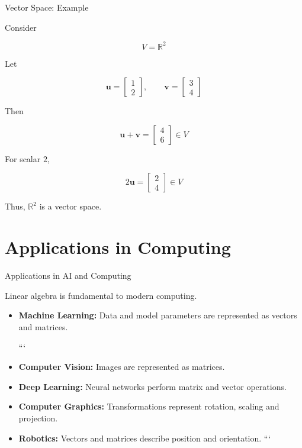 \documentclass[aspectratio=169]{beamer}
\begin{document}
\begin{frame}{Vector Space: Example}
\small

Consider

$$
V=\mathbb{R}^2
$$

Let

$$
\mathbf{u}=
\begin{bmatrix}
1\\
2
\end{bmatrix},
\qquad
\mathbf{v}=
\begin{bmatrix}
3\\
4
\end{bmatrix}
$$

Then

$$
\mathbf{u}+\mathbf{v}
=
\begin{bmatrix}
4\\
6
\end{bmatrix}
\in V
$$

For scalar $2$,

$$
2\mathbf{u}
=
\begin{bmatrix}
2\\
4
\end{bmatrix}
\in V
$$

Thus, $\mathbb{R}^2$ is a vector space.

\end{frame}

\section{Applications in Computing}

\begin{frame}{Applications in AI and Computing}
\small

Linear algebra is fundamental to modern computing.

\begin{itemize}
\item \textbf{Machine Learning:}
Data and model parameters are represented as vectors and matrices.

```
\item \textbf{Computer Vision:}
Images are represented as matrices.

\item \textbf{Deep Learning:}
Neural networks perform matrix and vector operations.

\item \textbf{Computer Graphics:}
Transformations represent rotation, scaling and projection.

\item \textbf{Robotics:}
Vectors and matrices describe position and orientation.
```

\end{itemize}

\end{frame}
\end{document}
